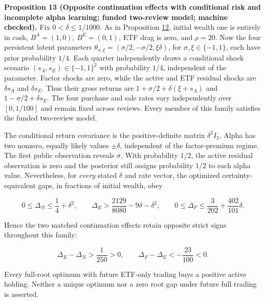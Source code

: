 \documentclass[11pt]{article}
\begin{document}
\label{res:Proposition-13}
\textbf{Proposition 13 (Opposite continuation effects with conditional risk and incomplete alpha learning; funded two-review model; machine checked).}
Fix \(0<\delta\leq1/1000\). As in Proposition \hyperref[res:Proposition-12]{12}, initial wealth
one is entirely in cash, \(B^A=(1,0)\), \(B^E=(0,1)\), ETF
drag is zero, and \(\rho=20\). Now the four persistent latent
parameters \(\theta_{\sigma,\xi}=(\sigma/2,-\sigma/2,\xi\delta)\),
for \(\sigma,\xi\in\{-1,1\}\), each have prior probability
\(1/4\). Each quarter independently draws a conditional shock
scenario \((s_A,s_E)\in\{-1,1\}^2\) with probability \(1/4\),
independent of the parameter. Factor shocks are zero, while the
active and ETF residual shocks are \(\delta s_A\) and
\(\delta s_E\). Thus their gross returns are
\(1+\sigma/2+\delta(\xi+s_A)\) and
\(1-\sigma/2+\delta s_E\). The four purchase and sale rates
vary independently over \([0,1/100]\) and remain fixed across
reviews. Every member of this family satisfies the funded
two-review model.

The conditional return covariance is the positive-definite
matrix \(\delta^2 I_2\). Alpha has two nonzero, equally likely
values \(\pm\delta\), independent of the factor-premium regime.
The first public observation reveals \(\sigma\). With probability
\(1/2\), the active residual observation is zero and the
posterior still assigns probability \(1/2\) to each alpha value.
Nevertheless, for \emph{every} stated \(\delta\) and rate vector,
the optimized certainty-equivalent gaps, in fractions of initial
wealth, obey

\begin{equation*}
0\leq\Delta_N\leq\frac14+\delta^2,\qquad
\Delta_E>\frac{2129}{8080}-9\delta-\delta^2,\qquad
0\leq\Delta_F\leq\frac{3}{202}+\frac{402}{101}\delta.
\tag{31}\label{eq:31}
\end{equation*}

Hence the two matched continuation effects retain opposite
strict signs throughout this family:

\begin{equation*}
\Delta_E-\Delta_N>\frac1{250}>0,\qquad
\Delta_F-\Delta_E<-\frac{23}{100}<0.
\tag{32}\label{eq:32}
\end{equation*}

Every full-root optimum with future ETF-only trading buys a
positive active holding. Neither a unique optimum nor a zero
root gap under future full trading is asserted.
\end{document}

